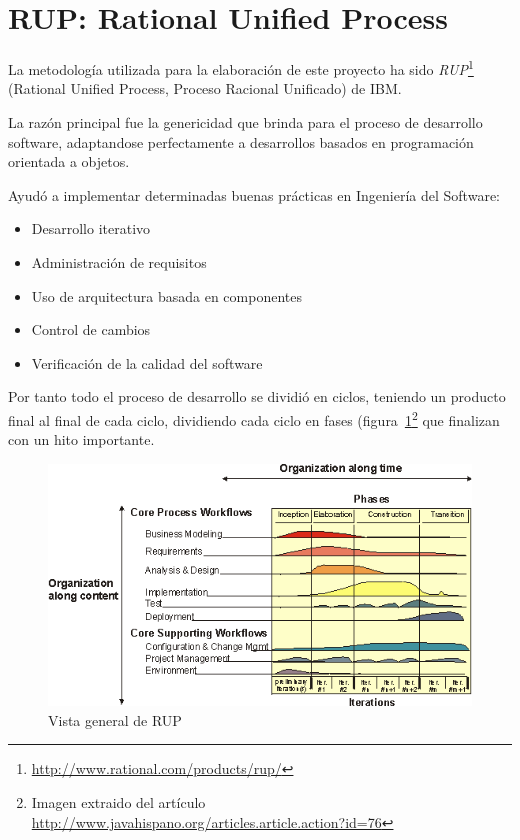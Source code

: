 
\section*{RUP: Rational Unified Process}

La metodología utilizada para la elaboración de este proyecto ha sido 
\emph{RUP}\footnote{\url{http://www.rational.com/products/rup/}}
(Rational Unified Process, Proceso Racional Unificado) de IBM.

La razón principal fue la genericidad que brinda para el proceso de desarrollo
software, adaptandose perfectamente a desarrollos basados en programación 
orientada a objetos.

Ayudó a implementar determinadas buenas prácticas en Ingeniería del Software:

\begin{itemize}
  \item Desarrollo iterativo
  \item Administración de requisitos
  \item Uso de arquitectura basada en componentes
  \item Control de cambios
  \item Verificación de la calidad del software
\end{itemize}

Por tanto todo el proceso de desarrollo se dividió en ciclos, teniendo un 
producto final al final de cada ciclo, dividiendo cada ciclo en fases
(figura~\ref{fig:RUP}\footnote{Imagen extraido del artículo
\url{http://www.javahispano.org/articles.article.action?id=76}} que 
finalizan con un hito importante.

\begin{figure}[ht]
	\centering
	\includegraphics[width=12cm]{images/rup.png}
	\caption{Vista general de RUP}
	\label{fig:RUP}
\end{figure}

